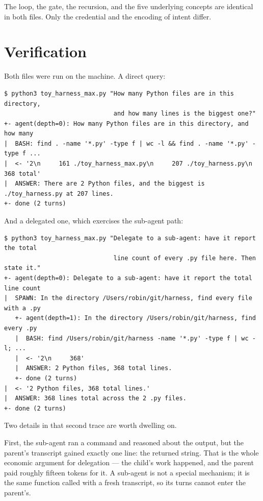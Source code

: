 \documentclass[11pt,a4paper]{article}
\begin{document}
The loop, the gate, the recursion, and the five underlying concepts are
identical in both files. Only the credential and the encoding of intent differ.

\section{Verification}

Both files were run on the machine. A direct query:

\begin{lstlisting}
$ python3 toy_harness_max.py "How many Python files are in this directory,
                              and how many lines is the biggest one?"
+- agent(depth=0): How many Python files are in this directory, and how many
|  BASH: find . -name '*.py' -type f | wc -l && find . -name '*.py' -type f ...
|  <- '2\n     161 ./toy_harness_max.py\n     207 ./toy_harness.py\n 368 total'
|  ANSWER: There are 2 Python files, and the biggest is ./toy_harness.py at 207 lines.
+- done (2 turns)
\end{lstlisting}

And a delegated one, which exercises the sub-agent path:

\begin{lstlisting}
$ python3 toy_harness_max.py "Delegate to a sub-agent: have it report the total
                              line count of every .py file here. Then state it."
+- agent(depth=0): Delegate to a sub-agent: have it report the total line count
|  SPAWN: In the directory /Users/robin/git/harness, find every file with a .py
   +- agent(depth=1): In the directory /Users/robin/git/harness, find every .py
   |  BASH: find /Users/robin/git/harness -name '*.py' -type f | wc -l; ...
   |  <- '2\n     368'
   |  ANSWER: 2 Python files, 368 total lines.
   +- done (2 turns)
|  <- '2 Python files, 368 total lines.'
|  ANSWER: 368 lines total across the 2 .py files.
+- done (2 turns)
\end{lstlisting}

Two details in that second trace are worth dwelling on.

First, the sub-agent ran a command and reasoned about the output, but the
parent's transcript gained exactly one line: the returned string. That is the
whole economic argument for delegation --- the child's work happened, and the
parent paid roughly fifteen tokens for it. A sub-agent is not a special
mechanism; it is the same function called with a fresh transcript, so its turns
cannot enter the parent's.
\end{document}
